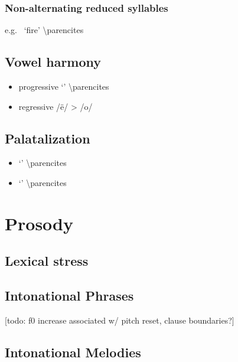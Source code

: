 \documentclass{memoir}
\begin{document}
\subsubsection{Non-alternating reduced syllables}

e.g.~ `fire' \textbackslash parencites

\subsection{\texorpdfstring{Vowel harmony
\label{sec:vowelharm}}{Vowel harmony }}

\begin{itemize}
\tightlist
\item
  progressive  `' \textbackslash parencites
\item
  regressive /ë/ \textgreater{} /o/
\end{itemize}

\subsection{\texorpdfstring{Palatalization
\label{sec:palatalization}}{Palatalization }}

\begin{itemize}
\tightlist
\item
   `' \textbackslash parencites
\item
   `' \textbackslash parencites
\end{itemize}

\section{\texorpdfstring{Prosody \label{sec:prosody}}{Prosody }}

\subsection{\texorpdfstring{Lexical stress
\label{sec:stress}}{Lexical stress }}

\subsection{\texorpdfstring{Intonational Phrases
\label{sec:intphrases}}{Intonational Phrases }}

{[}todo: f0 increase associated w/ pitch reset, clause boundaries?{]}

\subsection{\texorpdfstring{Intonational Melodies
\label{sec:intmelodies}}{Intonational Melodies }}
\end{document}
